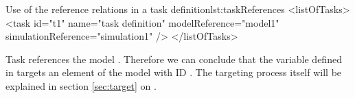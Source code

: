 \begin{myXmlLst}{Use of the reference relations in a task definition}{lst:taskReferences}
<listOfTasks>
	<task id="t1" name="task definition" modelReference="model1" simulationReference="simulation1" />
</listOfTasks>
\end{myXmlLst}
Task  references the model . Therefore we can conclude that the variable  defined in  targets an element of the model with ID . The targeting process itself will be explained in section \ref{sec:target} on .

